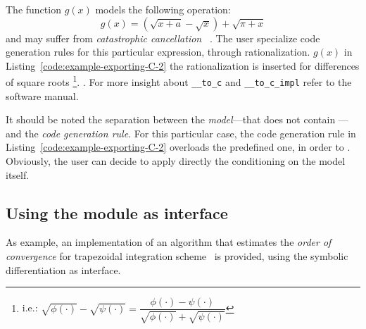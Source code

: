 The function $g(x)$ models the following operation:
\begin{equation}
g(x) = (\sqrt{x + a} - \sqrt{x}) + \sqrt{\pi + x}
\end{equation}
and may suffer from \emph{catastrophic  cancellation}~\cite{higham2002accuracy} . The user  specialize code generation rules for this particular expression,  through rationalization.  $g(x)$ in Listing~\ref{code:example-exporting-C-2} the rationalization is inserted  for differences of square roots
\footnote{i.e.:
$\sqrt{\phi(\cdot)} - \sqrt{\psi(\cdot)} =
\dfrac{\phi(\cdot) - \psi(\cdot)}{\sqrt{\phi(\cdot)} + \sqrt{\psi(\cdot)}}$}.
. For more insight about \verb!__to_c! and \verb!__to_c_impl!\review{,} refer to the software manual.

\noindent%


It should be noted the separation between the \emph{model}---that does not contain ---and the \emph{code generation rule}. For this particular case, the code generation rule in Listing~\ref{code:example-exporting-C-2} overloads the predefined one, in order to . Obviously, the user can decide to apply directly the conditioning on the model itself.

\noindent%
\begin{minipage}{.5\textwidth}

\end{minipage}\hfill
\begin{minipage}{.5\textwidth}

\end{minipage}

\subsection{Using the module as interface}
As example, an implementation of an algorithm that estimates the \emph{order of convergence} for trapezoidal integration scheme~\cite{weideman2002numerical} is provided, using the symbolic differentiation as interface.

